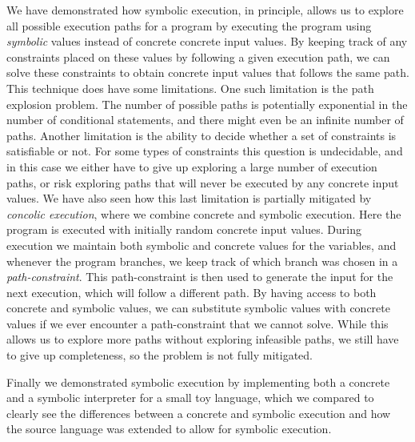 
We have demonstrated how symbolic execution, in principle, allows us to explore all possible execution paths for a program by executing the program using \emph{symbolic} values instead of concrete concrete input values. By keeping track of any constraints placed on these values by following a given execution path, we can solve these constraints to obtain concrete input values that follows the same path. This technique does have some limitations. One such limitation is the path explosion problem. The number of possible paths is potentially exponential in the number of conditional statements, and there might even be an infinite number of paths. Another limitation is the ability to decide whether a set of constraints is satisfiable or not. For some types of constraints this question is undecidable, and in this case we either have to give up exploring a large number of execution paths, or risk exploring paths that will never be executed by any concrete input values. We have also seen how this last limitation is partially mitigated by \emph{concolic execution}, where we combine concrete and symbolic execution. Here the program is executed with initially random concrete input values. During execution we maintain both symbolic and concrete values for the variables, and whenever the program branches, we keep track of which branch was chosen in a \emph{path-constraint}. This path-constraint is then used to generate the input for the next execution, which will follow a different path. By having access to both concrete and symbolic values, we can substitute symbolic values with concrete values if we ever encounter a path-constraint that we cannot solve. While this allows us to explore more paths without exploring infeasible paths, we still have to give up completeness, so the problem is not fully mitigated.

\noindent Finally we demonstrated symbolic execution by implementing both a concrete and a symbolic interpreter for a small toy language, which we compared to clearly see the differences between a concrete and symbolic execution and how the source language was extended to allow for symbolic execution. 
